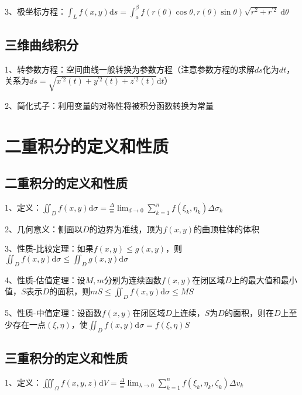 3、极坐标方程：$\int_{L} f(x, y) \mathrm{d} s=\int_{a}^{\beta} f(r(\theta) \cos \theta, r(\theta) \sin \theta) \sqrt{r^{2}+r^{\prime 2}} \mathrm{~d} \theta$



\subsection{三维曲线积分}

1、转参数方程：空间曲线一般转换为参数方程（注意参数方程的求解$ds$化为$dt$，关系为$ds = \sqrt{x^{\prime 2}(t)+y^{\prime 2}(t)+z^{\prime 2}(t)} \mathrm{d} t$）

2、简化式子：利用变量的对称性将被积分函数转换为常量

\section{二重积分的定义和性质}



\subsection{二重积分的定义和性质}

1、定义：$\iint_{D} f(x, y) \mathrm{d} \sigma=\frac{\Delta}{=} \lim _{d \rightarrow 0} \sum_{k=1}^{n} f\left(\xi_{k}, \eta_{k}\right) \Delta \sigma_{k}$

2、几何意义：侧面以$D$的边界为准线，顶为$f(x, y)$的曲顶柱体的体积

3、性质-比较定理：如果$f(x, y) \leqslant g(x, y)$，则$\iint_{D} f(x, y) \mathrm{d} \sigma \leqslant \iint_{D} g(x, y) \mathrm{d} \sigma$

4、性质-估值定理：设$M, m$分别为连续函数$f(x, y)$在闭区域$D$上的最大值和最小值，$S$表示$D$的面积，则$m S \leqslant \iint_{D} f(x, y) \mathrm{d} \sigma \leqslant M S$

5、性质-中值定理：设函数$f(x, y)$在闭区域$D$上连续，$S$为$D$的面积，则在$D$上至少存在一点$(\xi, \eta)$，使$\iint_{D} f(x, y) \mathrm{d} \sigma=f(\xi, \eta) S$



\subsection{三重积分的定义和性质}

1、定义：$\iiint_{\Omega} f(x, y,z) \mathrm{d} V=\frac{\Delta}{=} \lim _{\lambda \rightarrow 0} \sum_{k=1}^{n} f\left(\xi_{k}, \eta_{k},\zeta_{k} \right) \Delta v_{k}$

